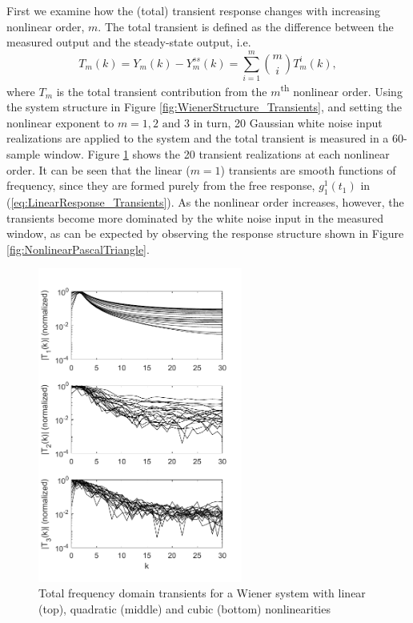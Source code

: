 First we examine how the (total) transient response changes with increasing nonlinear order, $m$. The total transient is defined as the difference between the measured output and the steady-state output, i.e. 
\begin{equation}
\label{eq:TotalTransient_Transients}
T_m(k) = Y_m(k) - Y_m^{ss}(k) = \sum_{i=1}^{m}\binom{m}{i} T_m^i(k),
\end{equation}
where $T_m$ is the total transient contribution from the $m$\textsuperscript{th} nonlinear order. Using the system structure in Figure \ref{fig:WienerStructure_Transients}, and setting the nonlinear exponent to $m=1, 2 \text{ and } 3$ in turn, 20 Gaussian white noise input realizations are applied to the system and the total transient is measured in a $60$-sample window. Figure \ref{fig:MC_Transients} shows the 20 transient realizations at each nonlinear order. It can be seen that the linear ($m=1$) transients are smooth functions of frequency, since they are formed purely from the free response, $g_1^1(t_1)$ in (\ref{eq:LinearResponse_Transients}). As the nonlinear order increases, however, the transients become more dominated by the white noise input in the measured window, as can be expected by observing the response structure shown in Figure \ref{fig:NonlinearPascalTriangle}.

\begin{figure}[!h]
\centering
\includegraphics[width=0.6\textwidth]{Chapter9_NonlinTransients/MC_Transients3.pdf}
\caption{Total frequency domain transients for a Wiener system with linear (top), quadratic (middle) and cubic (bottom) nonlinearities}
\label{fig:MC_Transients}
\end{figure}

